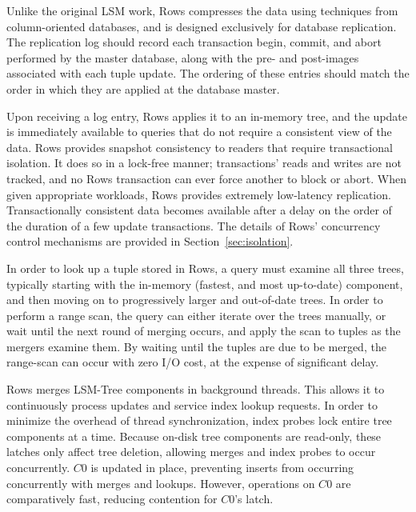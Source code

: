 \documentclass{sig-alternate-sigmod08}
\newcommand{\rows}{Rows\xspace}
\newcommand{\rowss}{Rows'\xspace}
\begin{document}
Unlike the original LSM work, \rows compresses the data using
techniques from column-oriented databases, and is designed exclusively
for database replication.  The replication log should record each
transaction begin, commit, and abort performed by the master database,
along with the pre- and post-images associated with each tuple update.
The ordering of these entries should match the order in which they are
applied at the database master.

Upon receiving a log entry, \rows applies it to an in-memory tree, and
the update is immediately available to queries that do not require a
consistent view of the data.  \rows provides snapshot consistency to
readers that require transactional isolation.  It does so in a
lock-free manner; transactions' reads and writes are not tracked, and
no \rows transaction can ever force another to block or abort.  When
given appropriate workloads, \rows provides extremely low-latency
replication.  Transactionally consistent data becomes available after
a delay on the order of the duration of a few update transactions.
The details of \rowss concurrency control mechanisms are provided in
Section~\ref{sec:isolation}.


In order to look up a tuple stored in \rows, a query must examine all
three trees, typically starting with the in-memory (fastest, and most
up-to-date) component, and then moving on to progressively larger and
out-of-date trees.  In order to perform a range scan, the query can
either iterate over the trees manually, or wait until the next round
of merging occurs, and apply the scan to tuples as the mergers examine
them.  By waiting until the tuples are due to be merged, the
range-scan can occur with zero I/O cost, at the expense of significant
delay.

\rows merges LSM-Tree components in background threads.  This allows
it to continuously process updates and service index lookup requests.
In order to minimize the overhead of thread synchronization, index
probes lock entire tree components at a time.  Because on-disk tree
components are read-only, these latches only affect tree deletion,
allowing merges and index probes to occur concurrently.  $C0$ is
updated in place, preventing inserts from occurring concurrently with
merges and lookups.  However, operations on $C0$ are comparatively
fast, reducing contention for $C0$'s latch.
\end{document}

